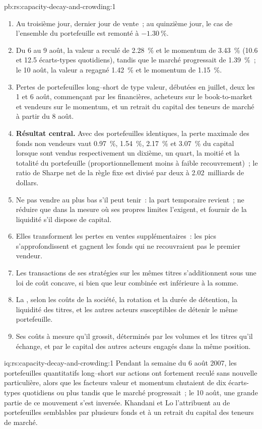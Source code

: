 \begin{solution}{pb:rs:capacity-decay-and-crowding:1}
\begin{enumerate}
\item Au troisième jour, dernier jour de vente~; au quinzième jour, le cas de l'ensemble du portefeuille est remonté à $-1.30~\%$.
\item Du 6 au 9 août, la valeur a reculé de 2.28~\% et le momentum de 3.43~\% (10.6 et 12.5 écarts-types quotidiens), tandis que le marché progressait de 1.39~\%~; le 10 août, la valeur a regagné
1.42~\% et le momentum de 1.15~\%.
\item Pertes de portefeuilles long--short de type valeur, débutées en juillet, deux  les 1 et 6 août, commençant par les financières, acheteurs sur le book-to-market et vendeurs sur le momentum,
et un retrait du capital des teneurs de marché à partir du 8 août.
\item \textbf{Résultat central.} Avec des portefeuilles identiques, la perte maximale des fonds non vendeurs vaut 0.97~\%, 1.54~\%, 2.17~\% et 3.07~\% du capital lorsque sont vendus respectivement un dixième, un quart, la moitié et
la totalité du portefeuille (proportionnellement moins à faible recouvrement)~; le ratio de Sharpe net de la règle fixe est divisé par deux à 2.02~milliards de dollars.
\item Ne pas vendre au plus bas s'il peut tenir~: la part temporaire revient~; ne réduire que dans la mesure où ses propres limites l'exigent, et fournir de la liquidité s'il dispose de capital.
\item Elles transforment les pertes en ventes supplémentaires~: les pics s'approfondissent et gagnent les fonds qui ne recouvraient pas le premier vendeur.
\item Les transactions de ses stratégies sur les mêmes titres s'additionnent sous une loi de coût concave, si bien que leur  combinée est inférieure à la somme.
\item La , selon les coûts de la société, la rotation et la durée de détention, la liquidité des titres, et les autres acteurs susceptibles de détenir le même portefeuille.
\item Ses coûts à mesure qu'il grossit, déterminés par les volumes et les titres qu'il échange, et par le capital des autres acteurs engagés dans la même position.
\end{enumerate}
\end{solution}

\begin{solution}{iq:rs:capacity-decay-and-crowding:1}
Pendant la semaine du 6 août 2007, les portefeuilles quantitatifs long--short sur actions ont fortement reculé sans nouvelle particulière, alors que les facteurs valeur et momentum chutaient de dix écarts-types quotidiens ou plus
tandis que le marché progressait~; le 10 août, une grande partie de ce mouvement s'est inversée. Khandani et Lo l'attribuent au  de portefeuilles semblables par plusieurs fonds et à un
retrait du capital des teneurs de marché.
\end{solution}

